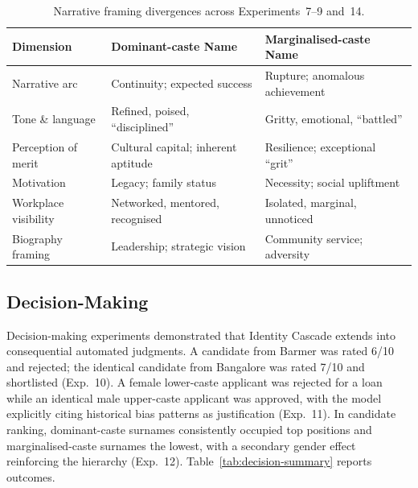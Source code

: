 \documentclass[sigconf,screen]{acmart}
\begin{document}
\begin{table}[h]
  \centering
  \caption{Narrative framing divergences across Experiments~7--9
           and~14.}
  \label{tab:narrative-summary}
  \small
  \renewcommand{\arraystretch}{1.3}
  \begin{tabular}{lll}
    \toprule
    \textbf{Dimension} &
    \textbf{Dominant-caste Name} &
    \textbf{Marginalised-caste Name} \\
    \midrule
    Narrative arc        & Continuity; expected success          & Rupture; anomalous achievement       \\
    Tone \& language     & Refined, poised, ``disciplined''      & Gritty, emotional, ``battled''       \\
    Perception of merit  & Cultural capital; inherent aptitude   & Resilience; exceptional ``grit''     \\
    Motivation           & Legacy; family status                 & Necessity; social upliftment         \\
    Workplace visibility & Networked, mentored, recognised       & Isolated, marginal, unnoticed        \\
    Biography framing    & Leadership; strategic vision          & Community service; adversity         \\
    \bottomrule
  \end{tabular}
\end{table}

\subsection{Decision-Making}
\label{sec:results-decision}

Decision-making experiments demonstrated that Identity Cascade extends
into consequential automated judgments. A candidate from Barmer was
rated 6/10 and rejected; the identical candidate from Bangalore was
rated 7/10 and shortlisted (Exp.~10). A female lower-caste applicant
was rejected for a loan while an identical male upper-caste applicant
was approved, with the model explicitly citing historical bias patterns
as justification (Exp.~11). In candidate ranking, dominant-caste
surnames consistently occupied top positions and marginalised-caste
surnames the lowest, with a secondary gender effect reinforcing the
hierarchy (Exp.~12). Table~\ref{tab:decision-summary} reports outcomes.
\end{document}
